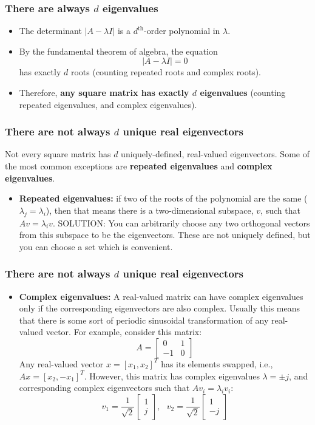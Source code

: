 \documentclass{beamer}
\begin{document}
\begin{frame}
  \frametitle{There are always $d$ eigenvalues}
  \begin{itemize}
  \item The determinant $|A-\lambda I|$ is a $d^{\textrm{th}}$-order polynomial in $\lambda$.
  \item By the fundamental theorem of algebra, the equation
    \[
    |A-\lambda I|=0
    \]
    has exactly $d$ roots (counting repeated roots and complex roots).
  \item Therefore, {\bf any square matrix has exactly $d$ eigenvalues}
    (counting repeated eigenvalues, and complex eigenvalues).
  \end{itemize}
\end{frame}

\begin{frame}
  \frametitle{There are not always $d$ unique real eigenvectors}

  Not every square matrix has $d$ uniquely-defined, real-valued
  eigenvectors.  Some of the most common exceptions are {\bf repeated
    eigenvalues} and {\bf complex eigenvalues}.
  \begin{itemize}
  \item {\bf Repeated eigenvalues:} if two of the roots of the
    polynomial are the same ($\lambda_j=\lambda_i$), then that means
    there is a two-dimensional subspace, ${v}$, such that
    $A{v}=\lambda_i{v}$.  SOLUTION: You can arbitrarily choose any two
    orthogonal vectors from this subspace to be the eigenvectors.
    These are not uniquely defined, but you can choose a set which is
    convenient.
  \end{itemize}
\end{frame}

\begin{frame}
  \frametitle{There are not always $d$ unique real eigenvectors}

  \begin{itemize}
  \item {\bf Complex eigenvalues:} A real-valued matrix can have
    complex eigenvalues only if the corresponding eigenvectors are
    also complex.  Usually this means that there is some sort of
    periodic sinusoidal transformation of any real-valued vector.  For
    example, consider this matrix:
    \[
    A=\left[\begin{array}{cc}0&1\\-1&0\end{array}\right]
    \]
    Any real-valued vector $x=[x_1,x_2]^T$ has its elements swapped,
    i.e., $Ax=[x_2,-x_1]^T$.  However, this matrix has complex
    eigenvalues $\lambda=\pm j$, and corresponding complex
    eigenvectors such that $Av_i=\lambda_iv_i$:
    \[
    {v}_1=\frac{1}{\sqrt{2}}\left[\begin{array}{c}1\\j\end{array}\right],~~~
    {v}_2=\frac{1}{\sqrt{2}}\left[\begin{array}{c}1\\-j\end{array}\right]
    \]
   \end{itemize}
\end{frame}
\end{document}
